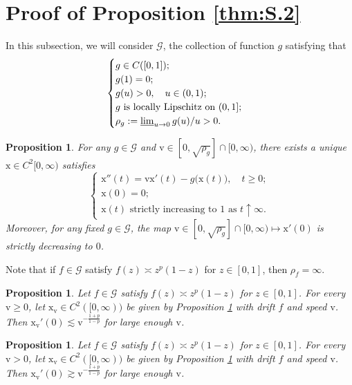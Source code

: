 \documentclass[12pt,a4paper]{amsart}
\numberwithin{equation}{section}
\theoremstyle{plain}
\newtheorem{proposition}[theorem]{Proposition}
\theoremstyle{remark}
\begin{document}
\section{Proof of Proposition \ref{thm:S.2}} \label{sec:f}
In this subsection, we will consider $\mathscr G$, the collection of function $g$ satisfying that
\begin{equation}
\begin{cases}
g \in C([0,1]); 
\\ g(1)  = 0;
\\ g(u)>0, \quad  u \in (0,1); 
\\ g \text{ is locally Lipschitz on } (0,1];
\\ \rho_g:=\varliminf_{u \to 0} g(u)/u > 0.	 
\end{cases}
\end{equation}

\begin{proposition} \label{thm:f.1}
	\color{blue}
	For any $g\in \mathscr G$ and $\mathrm v\in [0,\sqrt{\rho_g}] \cap [0,\infty)$, there exists a unique $\mathrm x \in C^2[0,\infty)$ satisfies
	\begin{equation}
	\begin{cases}
	 \mathrm x''(t) = \mathrm v \mathrm x'(t) - g\big(\mathrm x(t)\big), \quad t \geq 0;
	\\ \mathrm x(0)= 0;
	\\ \mathrm x(t) \text{ strictly increasing to } 1 \text{ as } t\uparrow \infty.
	\end{cases}
	\end{equation}
	Moreover, for any fixed $g \in \mathscr G$, the map $\mathrm v\in  [0, \sqrt{\rho_g}] \cap [0,\infty) \mapsto \mathrm x'(0)$ is strictly decreasing to $0$.
\end{proposition}
	Note that if $f\in \mathscr G$ satisfy $f(z) \asymp z^p(1-z)$ for $z\in [0,1]$, then $\rho_f = \infty$.

\begin{proposition}\label{thm:f.2}
	\color{blue}
	Let $f\in \mathscr G$ satisfy $f(z) \asymp z^p(1-z)$ for $z\in [0,1]$. 
	For every $\mathrm v\geq 0$, let $\mathrm x_{\mathrm v} \in C^2([0,\infty))$ be given by Proposition \ref{thm:f.1} with drift $f$ and speed $\mathrm v$. 
	Then $\mathrm x_{\mathrm v}'(0) \lesssim \mathrm v^{-\frac{1+p}{1-p}}$ for large enough $\mathrm v$.
\end{proposition}

\begin{proposition}\label{thm:f.3}
	\color{blue}
Let $f\in \mathscr G$ satisfy $f(z) \asymp z^p(1-z)$ for $z\in [0,1]$. 
For every $\mathrm v>0$, let $\mathrm x_{\mathrm v} \in C^2([0,\infty))$ be given by Proposition \ref{thm:f.1} with drift $f$ and speed $\mathrm v$. 
Then $\mathrm x_{\mathrm v}'(0) \gtrsim \mathrm v^{-\frac{1+p}{1-p}}$ for large enough $\mathrm v$.
\end{proposition}
\end{document}

